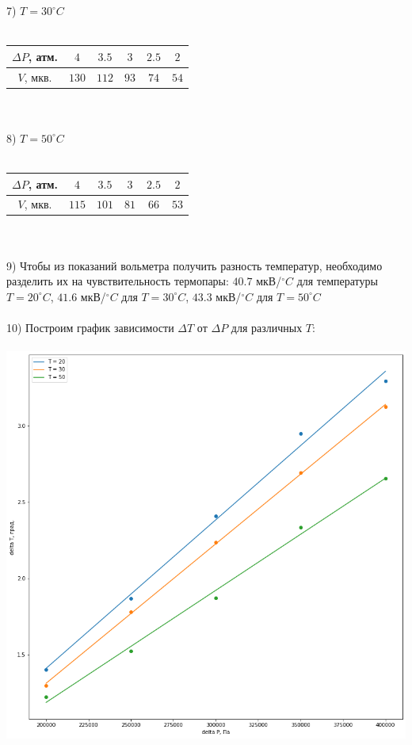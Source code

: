 \documentclass[12pt,a4paper]{article}
\begin{document}
	7) $T = 30^{\circ}C$\\\\
	\begin{tabular}{c | c | c | c | c | c}
		$\Delta P$, атм. & $4$ & $3.5$ & $3$ & $2.5$ & $2$ \\ \hline
		$V$, мкв. & $130$ & $112$ & $93$ & $74$ & $54$ \\
	\end{tabular}\\\\
	8) $T = 50^{\circ}C$\\\\
	\begin{tabular}{c | c | c | c | c | c}
		$\Delta P$, атм. & $4$ & $3.5$ & $3$ & $2.5$ & $2$ \\ \hline
		$V$, мкв. & $115$ & $101$ & $81$ & $66$ & $53$ \\
	\end{tabular}\\\\
	9) Чтобы из показаний вольметра получить разность температур, необходимо разделить их на чувствительность термопары: $40.7$ мкВ/$^{\circ}C$ для температуры $T = 20^{\circ}C$, $41.6$ мкВ/$^{\circ}C$ для $T = 30^{\circ}C$, $43.3$ мкВ/$^{\circ}C$ для $T = 50^{\circ}C$\\\\
	10) Построим график зависимости $\Delta T$ от $\Delta P$ для различных $T$:\\\\
	\includegraphics[scale=0.6]{graph.png} \\\\
\end{document}
